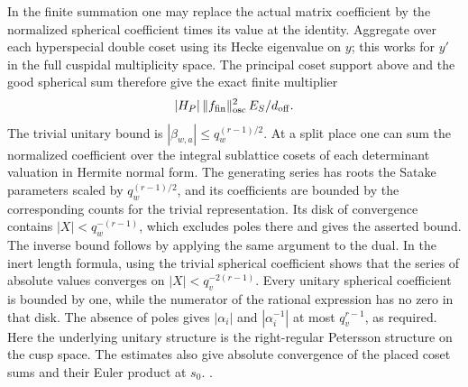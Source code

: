 In the finite summation one may replace the actual matrix
coefficient by the normalized spherical coefficient times its
value at the identity. Aggregate over each hyperspecial
double coset using its Hecke eigenvalue on \(y\); this works
for \(y'\) in the full cuspidal multiplicity space.
The principal coset support above and the good spherical
sum therefore give the exact finite multiplier
\[
 |H_P|\,\|f_{\rm fin}\|^2_{\rm osc}\,E_S/d_{\rm off}.
\]
The trivial unitary bound is
\(|\beta_{w,a}|\le q_w^{(r-1)/2}\).
At a split place one can sum the normalized coefficient over
the integral sublattice cosets of each determinant valuation
in Hermite normal form. The generating series has roots the
Satake parameters scaled by \(q_w^{(r-1)/2}\), and its
coefficients are bounded by the corresponding counts for the
trivial representation. Its disk of convergence contains
\(|X|<q_w^{-(r-1)}\), which excludes poles there and gives the
asserted bound. The inverse bound follows by applying the
same argument to the dual. In the inert length formula, using
the trivial spherical coefficient shows that the series of
absolute values converges on \(|X|<q_v^{-2(r-1)}\).
Every unitary spherical coefficient is bounded by one, while
the numerator of the rational expression has no zero in that
disk. The absence of poles gives \(|\alpha_i|\) and
\(|\alpha_i^{-1}|\) at most \(q_v^{r-1}\), as required.
Here the underlying unitary structure is the right-regular
Petersson structure on the cusp space. The estimates also
give absolute convergence of the placed coset sums and
their Euler product at \(s_0\).
.


